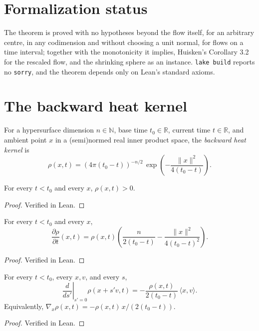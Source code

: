 \section*{Formalization status}

The theorem is proved with no hypotheses beyond the flow itself, for an arbitrary centre,
in any codimension and without choosing a unit normal, for flows on a time interval;
together with the monotonicity it implies, Huisken's Corollary 3.2 for the rescaled flow,
and the shrinking sphere as an instance. \texttt{lake build} reports no \texttt{sorry}, and the
theorem depends only on Lean's standard axioms.

\section{The backward heat kernel}

\begin{definition}
  \label{def:backward-heat-kernel}
  \leanok
  For a hypersurface dimension $n \in \mathbb{N}$, base time $t_0 \in \mathbb{R}$,
  current time $t \in \mathbb{R}$, and ambient point $x$ in a (semi)normed real
  inner product space, the \emph{backward heat kernel} is
  \[
    \rho(x, t) = (4\pi(t_0 - t))^{-n/2}\,
      \exp\!\left(-\frac{\|x\|^2}{4(t_0 - t)}\right).
  \]
\end{definition}

\begin{lemma}[positivity]
  \label{lem:rho-pos}
  \leanok
  For every $t < t_0$ and every $x$, $\rho(x, t) > 0$.
\end{lemma}
\begin{proof}\leanok Verified in Lean. \end{proof}

\begin{lemma}
  \label{lem:rho-dt}
  \leanok
  For every $t < t_0$ and every $x$,
  \[
    \frac{\partial \rho}{\partial t}(x, t) = \rho(x, t)
      \left(\frac{n}{2(t_0 - t)} - \frac{\|x\|^2}{4(t_0 - t)^2}\right).
  \]
\end{lemma}
\begin{proof}\leanok Verified in Lean. \end{proof}

\begin{lemma}
  \label{lem:rho-dx}
  \leanok
  For every $t < t_0$, every $x, v$, and every $s$,
  \[
    \left.\frac{d}{ds'}\right|_{s' = 0} \rho(x + s' v, t)
      = -\frac{\rho(x, t)}{2(t_0 - t)}\,\langle x, v\rangle.
  \]
  Equivalently, $\nabla_x \rho(x, t) = -\rho(x, t)\,x / (2(t_0 - t))$.
\end{lemma}
\begin{proof}\leanok Verified in Lean. \end{proof}

